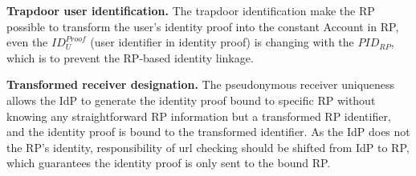 \vspace{1mm}\noindent \textbf{Trapdoor user identification.} The trapdoor identification make the RP possible to transform the user's identity proof into the constant Account in RP, even the $ID_U^{Proof}$ (user identifier in identity proof) is changing with the $PID_{RP}$, which is to prevent the RP-based identity linkage.

\vspace{1mm}\noindent \textbf{Transformed receiver designation.} The pseudonymous receiver uniqueness allows the IdP to generate the identity proof bound to specific RP without knowing any straightforward RP information but a transformed RP identifier, and the identity proof is bound to the transformed identifier. As the IdP does not the RP’s identity, responsibility of url checking should be shifted from IdP to RP, which guarantees the identity proof is only sent to the bound RP.

